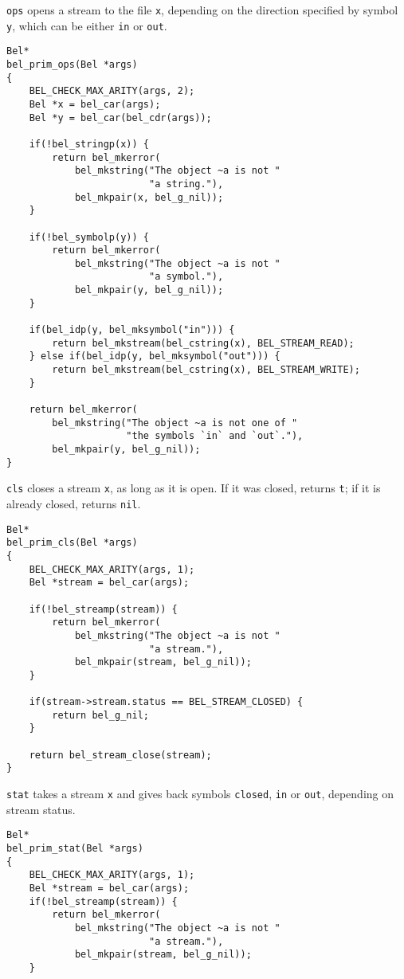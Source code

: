 \documentclass[openright,a4paper,twoside,12pt]{memoir}
\begin{document}
\begin{enumerate}
\begin{enumerate}
\texttt{ops} opens a stream to the file \texttt{x}, depending on the direction specified
by symbol \texttt{y}, which can be either \texttt{in} or \texttt{out}.

\begin{verbatim}
Bel*
bel_prim_ops(Bel *args)
{
    BEL_CHECK_MAX_ARITY(args, 2);
    Bel *x = bel_car(args);
    Bel *y = bel_car(bel_cdr(args));

    if(!bel_stringp(x)) {
        return bel_mkerror(
            bel_mkstring("The object ~a is not "
                         "a string."),
            bel_mkpair(x, bel_g_nil));
    }

    if(!bel_symbolp(y)) {
        return bel_mkerror(
            bel_mkstring("The object ~a is not "
                         "a symbol."),
            bel_mkpair(y, bel_g_nil));
    }

    if(bel_idp(y, bel_mksymbol("in"))) {
        return bel_mkstream(bel_cstring(x), BEL_STREAM_READ);
    } else if(bel_idp(y, bel_mksymbol("out"))) {
        return bel_mkstream(bel_cstring(x), BEL_STREAM_WRITE);
    }

    return bel_mkerror(
        bel_mkstring("The object ~a is not one of "
                     "the symbols `in` and `out`."),
        bel_mkpair(y, bel_g_nil));
}
\end{verbatim}

\texttt{cls} closes a stream \texttt{x}, as long as it is open. If it was closed,
returns \texttt{t}; if it is already closed, returns \texttt{nil}.

\begin{verbatim}
Bel*
bel_prim_cls(Bel *args)
{
    BEL_CHECK_MAX_ARITY(args, 1);
    Bel *stream = bel_car(args);

    if(!bel_streamp(stream)) {
        return bel_mkerror(
            bel_mkstring("The object ~a is not "
                         "a stream."),
            bel_mkpair(stream, bel_g_nil));
    }

    if(stream->stream.status == BEL_STREAM_CLOSED) {
        return bel_g_nil;
    }

    return bel_stream_close(stream);
}
\end{verbatim}

\texttt{stat} takes a stream \texttt{x} and gives back symbols \texttt{closed}, \texttt{in} or \texttt{out},
depending on stream status.

\begin{verbatim}
Bel*
bel_prim_stat(Bel *args)
{
    BEL_CHECK_MAX_ARITY(args, 1);
    Bel *stream = bel_car(args);
    if(!bel_streamp(stream)) {
        return bel_mkerror(
            bel_mkstring("The object ~a is not "
                         "a stream."),
            bel_mkpair(stream, bel_g_nil));
    }


\end{verbatim}
\end{enumerate}
\end{enumerate}
\end{document}
